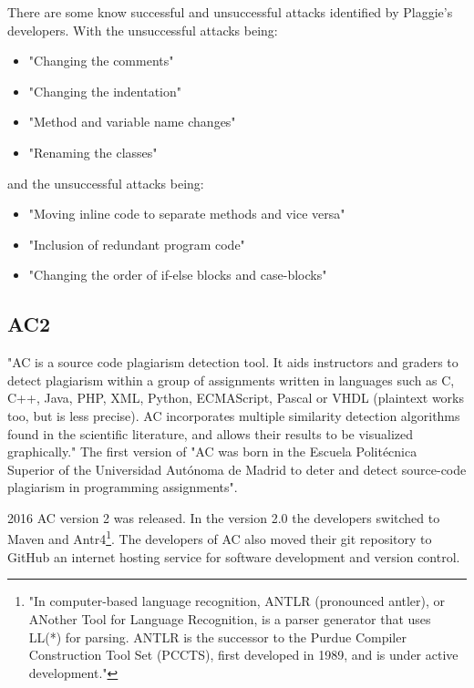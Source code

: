 \documentclass[a4paper, 11pt]{article}
\renewcommand{\\}{\vspace*{0.5\baselineskip} \newline}
\begin{document}
There are some know successful and unsuccessful attacks identified by Plaggie's developers. With the unsuccessful attacks being:
\begin{itemize}
	\item "Changing the comments"
	\item "Changing the indentation"
	\item "Method and variable name changes"
	\item "Renaming the classes"
\end{itemize} \autocite[Known successful attacks]{RMP}

and the unsuccessful attacks being:
\begin{itemize}
	\item "Moving inline code to separate methods and vice versa"
	\item "Inclusion of redundant program code"
	\item "Changing the order of if-else blocks and case-blocks"
\end{itemize}
\autocite[Known unsuccessful attacks]{RMP}

\subsection{AC2}

"AC is a source code plagiarism detection tool. It aids instructors and graders to detect plagiarism within a group of assignments written in languages such as C, C++, Java, PHP, XML, Python, ECMAScript, Pascal or VHDL (plaintext works too, but is less precise). AC incorporates multiple similarity detection algorithms found in the scientific literature, and allows their results to be visualized graphically." \autocite{AC2} The first version of "AC was born in the Escuela Politécnica Superior of the Universidad Autónoma de Madrid to deter and detect source-code plagiarism in programming assignments". \autocite{AC2}

2016 AC version 2 was released. In the version 2.0 the developers switched to Maven and Antr4\footnote{\label{footnoteAntlr}"In computer-based language recognition, ANTLR (pronounced antler), or ANother Tool for Language Recognition, is a parser generator that uses LL(*) for parsing. ANTLR is the successor to the Purdue Compiler Construction Tool Set (PCCTS), first developed in 1989, and is under active development."\autocite{enwiki:1115716413}}. The developers of AC also moved their git repository to GitHub an internet hosting service for software development and version control.
\end{document}
